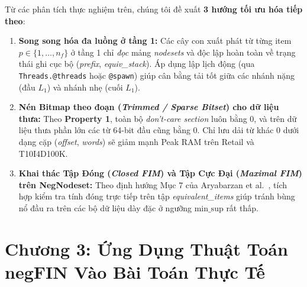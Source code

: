 \documentclass[conference]{IEEEtran}
\begin{document}
Từ các phân tích thực nghiệm trên, chúng tôi đề xuất \textbf{3 hướng tối ưu hóa tiếp theo}:
\begin{enumerate}
    \item \textbf{Song song hóa đa luồng ở tầng 1:} Các cây con xuất phát từ từng item $p \in \{1, \dots, n_f\}$ ở tầng 1 chỉ \textit{đọc} mảng \textit{nodesets} và độc lập hoàn toàn về trạng thái ghi cục bộ (\textit{prefix}, \textit{equiv\_stack}). Áp dụng lập lịch động (qua \texttt{Threads.@threads} hoặc \texttt{@spawn}) giúp cân bằng tải tốt giữa các nhánh nặng (đầu $L_1$) và nhánh nhẹ (cuối $L_1$).
    \item \textbf{Nén Bitmap theo đoạn (\textit{Trimmed / Sparse Bitset}) cho dữ liệu thưa:} Theo \textbf{Property 1}, toàn bộ \textit{don't-care section} luôn bằng $0$, và trên dữ liệu thưa phần lớn các từ 64-bit đầu cũng bằng $0$. Chỉ lưu dải từ khác $0$ dưới dạng cặp (\textit{offset}, \textit{words}) sẽ giảm mạnh Peak RAM trên Retail và T10I4D100K.
    \item \textbf{Khai thác Tập Đóng (\textit{Closed FIM}) và Tập Cực Đại (\textit{Maximal FIM}) trên NegNodeset:} Theo định hướng Mục 7 của Aryabarzan et al.~\cite{b9}, tích hợp kiểm tra tính đóng trực tiếp trên tập \textit{equivalent\_items} giúp tránh bùng nổ đầu ra trên các bộ dữ liệu dày đặc ở ngưỡng $\text{min\_sup}$ rất thấp.
\end{enumerate}

\FloatBarrier
\section{Chương 3: Ứng Dụng Thuật Toán negFIN Vào Bài Toán Thực Tế}
\end{document}
